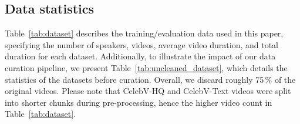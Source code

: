 \subsection{Data statistics}

Table~\ref{tab:dataset} describes the training/evaluation data used in this paper, specifying the number of speakers, videos, average video duration, and total duration for each dataset. Additionally, to illustrate the impact of our data curation pipeline, we present Table~\ref{tab:uncleaned_dataset}, which details the statistics of the datasets before curation. Overall, we discard roughly 75\,\% of the original videos. Please note that CelebV-HQ and CelebV-Text videos were split into shorter chunks during pre-processing, hence the higher video count in Table~\ref{tab:dataset}.


\begin{table}[ht]
\centering
{}
\caption{\textbf{Data statistics after curation and pre-processing.}}
\label{tab:dataset}
\end{table}

\begin{table}[ht]
\centering
{}
\caption{\textbf{Data statistics before curation.}}
\label{tab:uncleaned_dataset}
\end{table}


